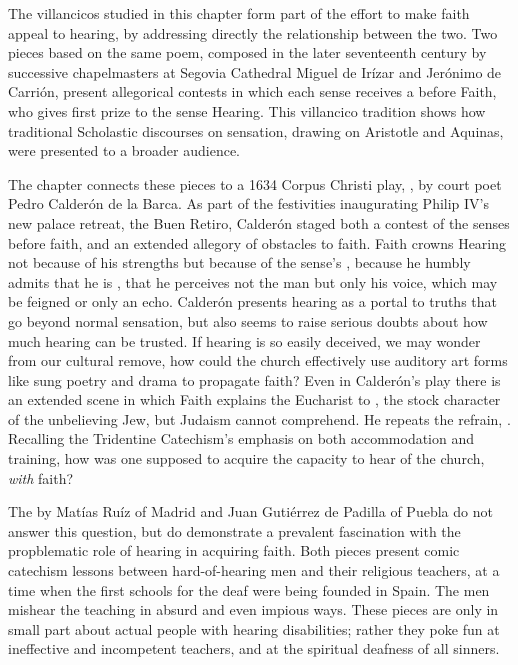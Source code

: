 \documentclass[tt]{vcbook-proposal}
\begin{document}
The villancicos studied in this chapter form part of the effort to make faith appeal to hearing, by addressing directly the relationship between the two.
Two pieces based on the same poem, composed in the later seventeenth century by successive chapelmasters at Segovia Cathedral Miguel de Irízar and Jerónimo de Carrión, present allegorical contests in which each sense receives a  before Faith, who gives first prize to the sense Hearing.
This villancico tradition shows how traditional Scholastic discourses on sensation, drawing on Aristotle and Aquinas, were presented to a broader audience.

The chapter connects these pieces to a 1634 Corpus Christi play, , by court poet Pedro Calderón de la Barca.
As part of the festivities inaugurating Philip IV's new palace retreat, the Buen Retiro, Calderón staged both a contest of the senses before faith, and an extended allegory of obstacles to faith.
Faith crowns Hearing not because of his strengths but because of the sense's , because he humbly admits that he is , that he perceives not the man but only his voice, which may be feigned or only an echo.
Calderón presents hearing as a portal to truths that go beyond normal sensation, but also seems to raise serious doubts about how much hearing can be trusted.
If hearing is so easily deceived, we may wonder from our cultural remove, how could the church effectively use auditory art forms like sung poetry and drama to propagate faith?
Even in Calderón's play there is an extended scene in which Faith explains the Eucharist to  , the stock character of the unbelieving Jew, but Judaism cannot comprehend.
He repeats the refrain, .
Recalling the Tridentine Catechism's emphasis on both accommodation and training, how was one supposed to acquire the capacity to hear  of the church, \emph{with} faith?

The  by Matías Ruíz of Madrid and Juan Gutiérrez de Padilla of Puebla do not answer this question, but do demonstrate a prevalent fascination with the propblematic role of hearing in acquiring faith.
Both pieces present comic catechism lessons between hard-of-hearing men and their religious teachers, at a time when the first schools for the deaf were being founded in Spain.
The  men mishear the teaching in absurd and even impious ways.
These pieces are only in small part about actual people with hearing disabilities; rather they poke fun at ineffective and incompetent teachers, and at the spiritual deafness of all sinners.
\end{document}
